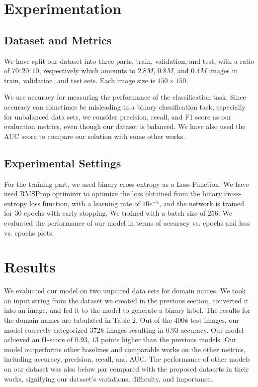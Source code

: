 \documentclass[letterpaper]{article} \usepackage{aaai22}  \usepackage{times}  \usepackage{helvet}  \usepackage{courier}  \usepackage[hyphens]{url}  \usepackage{graphicx} \urlstyle{rm} \def\UrlFont{\rm}  \usepackage{natbib}  \usepackage{caption} \DeclareCaptionStyle{ruled}{labelfont=normalfont,labelsep=colon,strut=off} \frenchspacing  \setlength{\pdfpagewidth}{8.5in}  \setlength{\pdfpageheight}{11in}  \usepackage{algorithm}
\begin{document}
\section{Experimentation}

\subsection{Dataset and Metrics}
We have split our dataset into three parts, train, validation, and test, with a ratio of $70:20:10$, respectively which amounts to $2.8M$, $0.8M$, and $0.4M$ images in train, validation, and test sets. Each image size is $150\times150$. 

We use accuracy for measuring the performance of the classification task. Since accuracy can sometimes be misleading in a binary classification task, especially for unbalanced data sets, we consider precision, recall, and F1 score as our evaluation metrics, even though our dataset is balanced. We have also used the AUC score to compare our solution with some other works.

\subsection{Experimental Settings}
For the training part, we used binary cross-entropy as a Loss Function. We have used RMSProp optimizer to optimize the loss obtained from the binary cross-entropy loss function, with a learning rate of $10e^{-4}$, and the network is trained for $30$ epochs with early stopping. We trained with a batch size of $256$. We evaluated the performance of our model in terms of accuracy vs. epochs and loss vs. epochs plots.

\section{Results}
We evaluated our model on two unpaired data sets for domain names. We took an input string from the dataset we created in the previous section, converted it into an image, and fed it to the model to generate a binary label. The results for the domain names are tabulated in Table 2. Out of the $400k$ test images, our model correctly categorized $372k$ images resulting in $0.93$ accuracy. Our model achieved an f1-score of $0.93$, $13$ points higher than the previous models. Our model outperforms other baselines and comparable works on the other metrics, including accuracy, precision, recall, and AUC. The performance of other models on our dataset was also below par compared with the proposed datasets in their works, signifying our dataset's variations, difficulty, and importance. 
\end{document}
